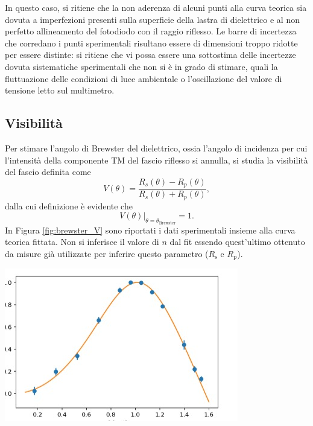 \documentclass[10pt,oneside,a4paper]{article}
\newenvironment{Figure}
  {\par\medskip\noindent\minipage{\linewidth}}
  {\endminipage\par\medskip}
\begin{document}
\begin{multicols}{2}
In questo caso, si ritiene che la non aderenza di alcuni punti alla curva teorica sia dovuta a imperfezioni presenti sulla superficie della lastra di dielettrico e al non perfetto allineamento del fotodiodo con il raggio riflesso. Le barre di incertezza che corredano i punti sperimentali risultano essere di dimensioni troppo ridotte per essere distinte: si ritiene che vi possa essere una sottostima delle incertezze dovuta sistematiche sperimentali che non si è in grado di stimare, quali la fluttuazione delle condizioni di luce ambientale o l'oscillazione del valore di tensione letto sul multimetro.

\subsection{Visibilità}
Per stimare l'angolo di Brewster del dielettrico, ossia l'angolo di incidenza per cui l'intensità della componente TM del fascio riflesso si annulla, si studia la visibilità del fascio definita come
\begin{equation}\label{eq:visibilità}
	V(\theta) = \frac{R_s(\theta) - R_p(\theta)}{R_s(\theta) + R_p(\theta)},
\end{equation}
dalla cui definizione è evidente che
\begin{equation}
	\left. V(\theta) \right\vert_{\theta = \theta_\mathrm{Brewster}} = 1.
\end{equation}
In Figura \ref{fig:brewster_V} sono riportati i dati sperimentali insieme alla curva teorica fittata. Non si inferisce il valore di $n$ dal fit essendo quest'ultimo ottenuto da misure già utilizzate per inferire questo parametro ($R_\mathrm{s}$ e $R_\mathrm{p}$).
\begin{Figure}
	\begin{center}
	\includegraphics[width=\linewidth]{visibilita.jpg}

\end{center}
\end{Figure}
\end{multicols}
\end{document}
